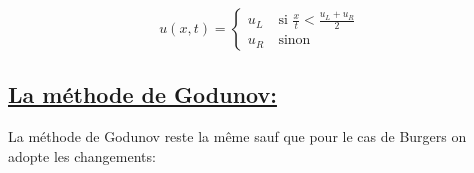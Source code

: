 \begin{itemize}
\begin{equation}
\label{systeme}
u(x,t) =
\left \lbrace \begin{array}{rl}
u_L & ~\text{si }  \frac{x}{t} < \frac{u_L + u_R}{2}\\
u_R & ~\text{sinon }  
\end{array}\right.
\end{equation}

\end{itemize}

\subsection[La m\'ethode de Godunov]{\uline{La m\'ethode de Godunov:}}

La m\'ethode de Godunov reste la m\^eme sauf que pour le cas de Burgers on adopte les changements:

